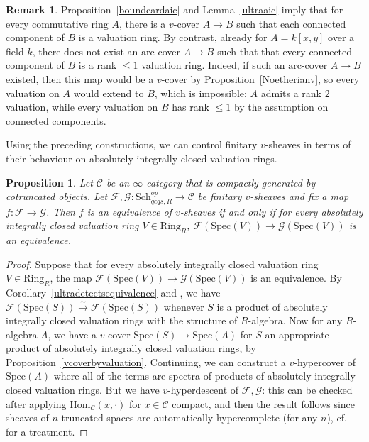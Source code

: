 \documentclass[reqno]{amsart}
\newcommand{\spec}{\mathrm{Spec}}
\newcommand{\arc}{\mathrm{arc}}
\renewcommand{\hom}{\mathrm{Hom}}
\newtheorem{proposition}[theorem]{Proposition}
\theoremstyle{definition}
\newtheorem{remark}[theorem]{Remark}
\begin{document}
\begin{remark}
Proposition~\ref{boundcardaic} and Lemma~\ref{ultraaic} imply that for every
commutative ring $A$, there is a $v$-cover $A \to B$ such that each connected
component of $B$ is a valuation ring. By contrast, already for $A=k[x,y]$ over a field $k$, there does not exist an $\arc$-cover $A \to B$ such that that every connected component of $B$ is a rank $\leq 1$ valuation ring. Indeed, if such an $\arc$-cover $A \to B$ existed, then this map would be a $v$-cover by Proposition~\ref{Noetherianv}, so every valuation on $A$ would extend to $B$, which is impossible: $A$ admits a rank $2$ valuation, while every valuation on $B$ has rank $\leq 1$ by the assumption on connected components.
\end{remark}




Using the preceding constructions, we can control finitary $v$-sheaves in terms of their behaviour on absolutely integrally closed valuation rings. 



\begin{proposition} 
\label{aicvaldetect}
Let $\mathcal{C}$ be an $\infty$-category that is compactly generated by cotruncated objects. 
Let $\mathcal{F}, \mathcal{G}\colon  \mathrm{Sch}_{qcqs,R}^{op} \to \mathcal{C}$ be  finitary
$v$-sheaves and fix a map $f\colon  \mathcal{F} \to \mathcal{G}$. 
Then $f$ is an equivalence of $v$-sheaves if and only if 
for every absolutely integrally closed valuation ring $V \in
\mathrm{Ring}_R$, $\mathcal{F}(\mathrm{Spec}(V)) \to \mathcal{G}( \spec(V)) $
is an equivalence.  
\end{proposition} 
\begin{proof} 
Suppose that for every 
absolutely integrally closed valuation ring $V \in
\mathrm{Ring}_R$, the map $\mathcal{F}(\mathrm{Spec}(V)) \to \mathcal{G}( \spec(V)) $ is
an equivalence. 
By Corollary~\ref{ultradetectsequivalence} and , we have
$\mathcal{F}(\mathrm{Spec}(S)) \xrightarrow{\sim} \mathcal{F}( \spec(S))$
whenever $S$ is a product of absolutely integrally closed valuation rings with
the structure of $R$-algebra. 
Now for any $R$-algebra $A$, we have a $v$-cover $\spec(S) \to \spec(A)$ for $S$ an appropriate
product of absolutely integrally closed valuation rings, by Proposition~\ref{vcoverbyvaluation}. 
Continuing, we can construct a 
$v$-hypercover of $\spec(A)$ where all of the terms are spectra of products of absolutely integrally closed valuation
rings. But we have $v$-hyperdescent of $\mathcal{F}, \mathcal{G}$: this can be checked after
applying $\hom_{\mathcal{C}}(x, \cdot)$ for $x \in \mathcal{C}$ compact, and
then the result  follows since sheaves of $n$-truncated spaces are automatically
hypercomplete (for any $n$), cf.~\cite[Sec.~6.5.3]{HTT} for a treatment. \end{proof} 
\end{document}
